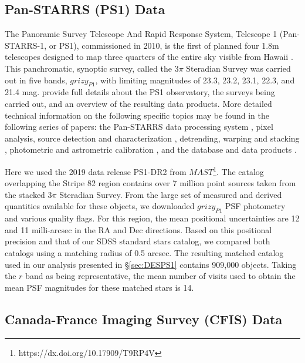 \documentclass[fleqn,usenatbib]{mnras}
\begin{document}

\subsection{Pan-STARRS (PS1) Data} \label{ssec:ps1}
 
The Panoramic Survey Telescope And Rapid Response System, Telescope 1 (Pan-STARRS-1, or PS1), commissioned 
in 2010, is the first of planned four 1.8m telescopes designed to map three quarters of the entire sky visible from 
Hawaii \citep{2010SPIE.7733E..0EK}. This panchromatic, synoptic survey, called the 3$\pi$ Steradian Survey was 
carried out in five bands, $grizy_{P1}$, with limiting magnitudes of 23.3, 23.2, 23.1, 22.3, and 21.4 mag. 
\citet{2016arXiv161205560C} provide full details about the PS1 observatory, the surveys being carried out, and an overview of the resulting data products. More detailed technical information on the following specific topics may be found in the following series of papers: the Pan-STARRS data processing system \citep{Euge20a}, pixel analysis, source detection and characterization \citep{Euge20b}, detrending, warping and stacking \citep{Wate2020}, photometric and astrometric calibration \citep{Euge20c}, and the database and data products \citep{Flew2020}. 
 
Here we used the 2019 data release PS1-DR2 from $MAST$\footnote{https://dx.doi.org/10.17909/T9RP4V}. The catalog overlapping the Stripe 82 region contains over 7 million point sources taken from the stacked 3$\pi$ Steradian Survey. From the large set of measured and derived quantities available for these objects, we downloaded $grizy_{P1}$ PSF photometry and various quality flags. For this region, the mean positional uncertainties are 12 and 11 milli-arcsec in the RA and Dec directions. Based on this positional precision and that of our SDSS standard stars catalog, we compared both catalogs using a matching 
radius of 0.5 arcsec. The resulting matched catalog used in our analysis presented in \S \ref{sec:DESPS1} contains 
909,000 objects. Taking the $r$ band as being representative, the mean number of visits used to obtain the mean 
PSF magnitudes for these matched stars is 14. 


\subsection{Canada-France Imaging Survey (CFIS) Data} \label{ssec:cfis}
\end{document}

